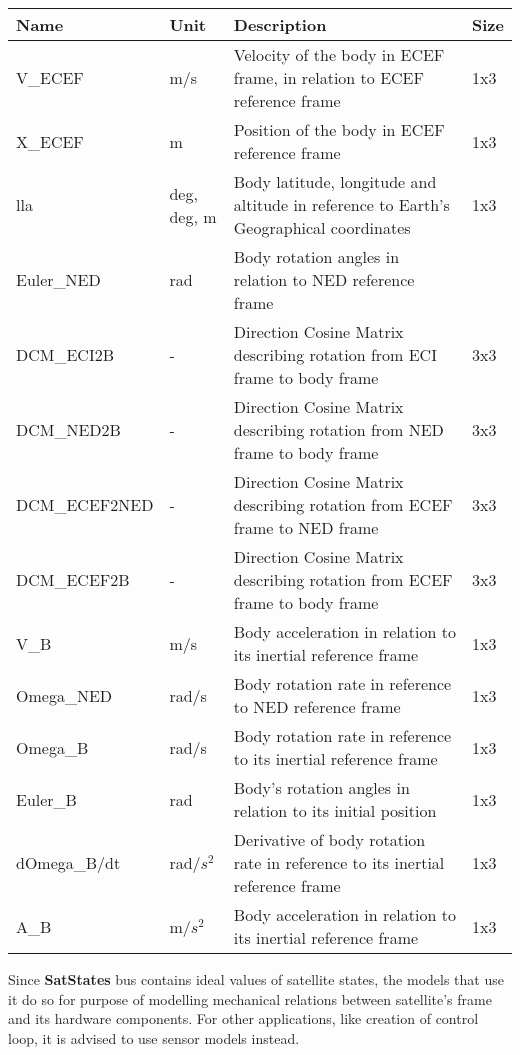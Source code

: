         \begin{table}[H]
            \begin{tabular}{llll}
            \hline
            Name & Unit & Description & Size \\ \hline
            V\_ECEF & m/s & Velocity of the body in ECEF frame, in relation to ECEF reference frame & 1x3 \\
            X\_ECEF & m & Position of the body in ECEF reference frame & 1x3 \\
            lla & deg, deg, m & Body latitude, longitude and altitude in reference to Earth's Geographical coordinates & 1x3 \\
            Euler\_NED & rad & Body rotation angles in relation to NED reference frame &  \\
            DCM\_ECI2B & - & Direction Cosine Matrix describing rotation from ECI frame to body frame & 3x3 \\
            DCM\_NED2B & - &  Direction Cosine Matrix describing rotation from NED frame to body frame & 3x3  \\
            DCM\_ECEF2NED & - & Direction Cosine Matrix describing rotation from ECEF frame to NED frame & 3x3  \\
            DCM\_ECEF2B & - &  Direction Cosine Matrix describing rotation from ECEF frame to body frame & 3x3  \\
            V\_B & m/s & Body acceleration in relation to its inertial reference frame &  1x3 \\
            Omega\_NED & rad/s & Body rotation rate in reference to NED reference frame & 1x3  \\
            Omega\_B & rad/s & Body rotation rate in reference to its inertial reference frame  & 1x3 \\
            Euler\_B & rad & Body's rotation angles in relation to its initial position  & 1x3 \\
            dOmega\_B/dt & rad/$s^2$ & Derivative of body rotation rate in reference to its inertial reference frame & 1x3 \\
            A\_B & m/$s^2$ & Body acceleration in relation to its inertial reference frame & 1x3 \\ \hline
            \end{tabular}
        \end{table}
        

        Since \textbf{SatStates} bus contains ideal values of satellite states, the models that use it do so for purpose of modelling mechanical relations between satellite's frame and its hardware components. For other applications, like creation of control loop, it is advised to use sensor models instead.
